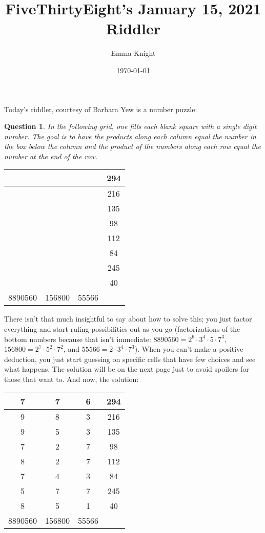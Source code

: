 \documentclass[11pt]{article}
\title{FiveThirtyEight's January 15, 2021 Riddler}
\author{Emma Knight}
\date{\today}
\newtheorem{question}[theorem]{Question}
\theoremstyle{definition}
\begin{document}
\maketitle
Today's riddler, courtesy of Barbara Yew is a number puzzle:
\begin{question}
In the following grid, one fills each blank square with a single digit number.  The goal is to have the products along each column equal the number in the box below the column and the product of the numbers along each row equal the number at the end of the row.
\end{question}
\begin{center}
\begin{tabular}{|c|c|c||c|}
\hline
 & & & 294 \\ \hline
& & & 216 \\ \hline
& & & 135 \\ \hline
& & & 98 \\ \hline
& & & 112 \\ \hline
& & & 84 \\ \hline
& & & 245 \\ \hline
& & & 40 \\ \hline \hline
8890560 & 156800 & 55566 & \\ \hline
\end{tabular}
\end{center}
There isn't that much insightful to say about how to solve this; you just factor everything and start ruling possibilities out as you go (factorizations of the bottom numbers because that isn't immediate: $8890560 = 2^6\cdot3^4\cdot5\cdot7^3$, $156800 = 2^7\cdot5^2\cdot7^2$, and $55566 = 2\cdot3^4\cdot7^3$).  When you can't make a positive deduction, you just start guessing on specific cells that have few choices and see what happens.  The solution will be on the next page just to avoid spoilers for those that want to.
\newpage
And now, the solution:
\begin{center}
\begin{tabular}{|c|c|c||c|}
\hline
7 & 7 & 6 & 294 \\ \hline
9 & 8 & 3 & 216 \\ \hline
9 & 5 & 3 & 135 \\ \hline
7 & 2 & 7 & 98 \\ \hline
8 & 2 & 7 & 112 \\ \hline
7 & 4 & 3 & 84 \\ \hline
5 & 7 & 7 & 245 \\ \hline
8 & 5 & 1 & 40 \\ \hline \hline
8890560 & 156800 & 55566 & \\ \hline
\end{tabular}
\end{center}
\end{document}
